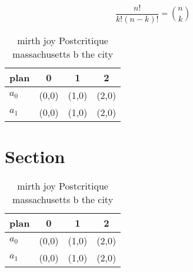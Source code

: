 \documentclass[a4paper]{article}
\begin{document}
\[ \frac{n!}{k!(n-k)!} = \binom{n}{k} \]

\begin{table}
\begin{adjustbox}{width=0.6\columnwidth}
\begin{tabular}{|l|l|l|l|}
\hline
\textbf{plan} & \multicolumn{1}{c|}{\textbf{0}} & \multicolumn{1}{c|}{\textbf{1}} & \multicolumn{1}{c|}{\textbf{2}} \\ \hline
\textbf{$a_0$}  & (0,0) & (1,0) & (2,0) \\ \hline
\textbf{$a_1$}  & (0,0) & (1,0) & (2,0) \\ \hline
\end{tabular}
\end{adjustbox}
\caption{ mirth joy Postcritique massachusetts b the city 
}
\end{table}

\section{Section}

\begin{table}
\begin{adjustbox}{width=0.6\columnwidth}
\begin{tabular}{|l|l|l|l|}
\hline
\textbf{plan} & \multicolumn{1}{c|}{\textbf{0}} & \multicolumn{1}{c|}{\textbf{1}} & \multicolumn{1}{c|}{\textbf{2}} \\ \hline
\textbf{$a_0$}  & (0,0) & (1,0) & (2,0) \\ \hline
\textbf{$a_1$}  & (0,0) & (1,0) & (2,0) \\ \hline
\end{tabular}
\end{adjustbox}
\caption{ mirth joy Postcritique massachusetts b the city 
}
\end{table}
\end{document}
